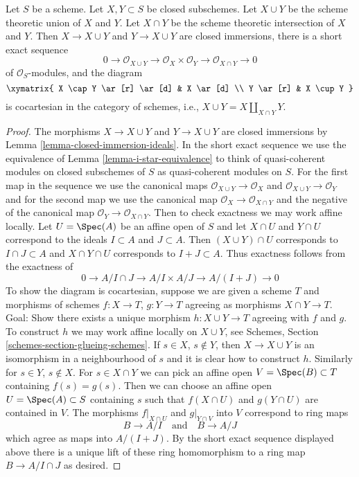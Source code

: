 \begin{lemma}
\label{lemma-scheme-theoretic-union}
Let $S$ be a scheme. Let $X, Y \subset S$ be closed subschemes.
Let $X \cup Y$ be the scheme theoretic union of $X$ and $Y$.
Let $X \cap Y$ be the scheme theoretic intersection of $X$ and $Y$.
Then $X \to X \cup Y$ and $Y \to X \cup Y$ are closed immersions, there is a
short exact sequence
$$
0 \to \mathcal{O}_{X \cup Y} \to \mathcal{O}_X \times \mathcal{O}_Y
\to \mathcal{O}_{X \cap Y} \to 0
$$
of $\mathcal{O}_S$-modules, and the diagram
$$
\xymatrix{
X \cap Y \ar[r] \ar[d] & X \ar[d] \\
Y \ar[r] & X \cup Y
}
$$
is cocartesian in the category of schemes, i.e.,
$X \cup Y = X \amalg_{X \cap Y} Y$.
\end{lemma}

\begin{proof}
The morphisms $X \to X \cup Y$ and $Y \to X \cup Y$ are closed immersions
by Lemma \ref{lemma-closed-immersion-ideals}. In the short exact sequence
we use the equivalence of Lemma \ref{lemma-i-star-equivalence} to think of
quasi-coherent modules on closed subschemes of $S$ as quasi-coherent modules
on $S$. For the first map in the sequence we use the canonical maps
$\mathcal{O}_{X \cup Y} \to \mathcal{O}_X$ and
$\mathcal{O}_{X \cup Y} \to \mathcal{O}_Y$
and for the second map we use the canonical map
$\mathcal{O}_X \to \mathcal{O}_{X \cap Y}$ and
the negative of the canonical map
$\mathcal{O}_Y \to \mathcal{O}_{X \cap Y}$. Then to check
exactness we may work affine locally.
Let $U = \Spec(A)$ be an affine open of $S$ and let $X \cap U$ and $Y \cap U$
correspond to the ideals $I \subset A$ and $J \subset A$. Then
$(X \cup Y) \cap U$ corresponds to $I \cap J \subset A$
and $X \cap Y \cap U$ corresponds to $I + J \subset A$.
Thus exactness follows from the exactness of
$$
0 \to A/I \cap J \to A/I \times A/J \to A/(I + J) \to 0
$$
To show the diagram is cocartesian, suppose we are given a scheme $T$
and morphisms of schemes $f : X \to T$, $g : Y \to T$ agreeing
as morphisms $X \cap Y \to T$. Goal: Show there exists a unique
morphism $h : X \cup Y \to T$ agreeing with $f$ and $g$.
To construct $h$ we may work affine locally on $X \cup Y$, see
Schemes, Section \ref{schemes-section-glueing-schemes}.
If $s \in X$, $s \not \in Y$, then $X \to X \cup Y$ is
an isomorphism in a neighbourhood of $s$ and it is clear
how to construct $h$. Similarly for $s \in Y$, $s \not \in X$.
For $s \in X \cap Y$ we can pick an affine open
$V = \Spec(B) \subset T$ containing $f(s) = g(s)$.
Then we can choose an affine open $U = \Spec(A) \subset S$
containing $s$ such that $f(X \cap U)$ and $g(Y \cap U)$
are contained in $V$. The morphisms $f|_{X \cap U}$
and $g|_{Y \cap V}$ into $V$ correspond to ring maps
$$
B \to A/I
\quad\text{and}\quad
B \to A/J
$$
which agree as maps into $A/(I + J)$. By the short exact sequence
displayed above there is a unique lift of these ring homomorphism
to a ring map $B \to A/I \cap J$ as desired.
\end{proof}









